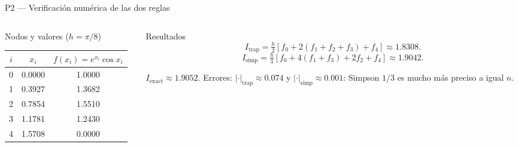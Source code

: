 \documentclass[aspectratio=169,10pt]{beamer}
\begin{document}
\begin{frame}{P2 — Verificación numérica de las dos reglas}
\begin{columns}[T]
\begin{column}{0.52\textwidth}
\begin{cardgear}{Nodos y valores ($h=\pi/8$)}{\faTable}
\centering
{\footnotesize\renewcommand{\arraystretch}{1.2}\setlength{\tabcolsep}{6pt}
\begin{tabular}{c|c|c}
$i$ & $x_i$ & $f(x_i)=e^{x_i}\cos x_i$\\\hline
0 & 0.0000 & 1.0000\\
1 & 0.3927 & 1.3682\\
2 & 0.7854 & 1.5510\\
3 & 1.1781 & 1.2430\\
4 & 1.5708 & 0.0000\\
\end{tabular}}
\end{cardgear}
\end{column}
\begin{column}{0.46\textwidth}
\begin{cardgear}{Resultados}{\faCalculator}
{\scriptsize
\[
I_{\text{trap}}=\tfrac{h}{2}\!\left[f_0+2(f_1{+}f_2{+}f_3)+f_4\right]\approx1.8308.
\]
\[
I_{\text{simp}}=\tfrac{h}{3}\!\left[f_0+4(f_1{+}f_3)+2f_2+f_4\right]\approx1.9042.
\]}
\end{cardgear}
\vspace{1mm}
\begin{cardnota}[\faCheckCircle]
{\footnotesize $I_{\text{exact}}\approx1.9052$. Errores: $|{\cdot}|_{\text{trap}}\approx0.074$ y $|{\cdot}|_{\text{simp}}\approx0.001$: Simpson $1/3$ es mucho más preciso a igual $n$.}
\end{cardnota}
\end{column}
\end{columns}
\end{frame}
\end{document}
